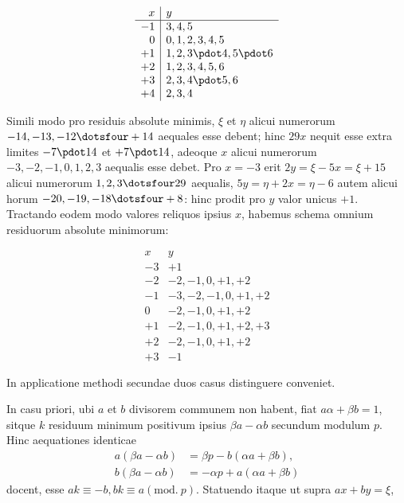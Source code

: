 %
\[
\begin{array}{r|l}
x&y\\\hline
-1&3,4,5\\
0&0,1,2,3,4,5\\
+1&1,2,3\pdot4,5\pdot6\\
+2&1,2,3,4,5,6\\
+3&2,3,4\pdot5,6\\
+4&2,3,4
\end{array}
\]

Simili modo pro residuis absolute minimis, $\xi$ et $\eta$ alicui numerorum $-14,-13,-12\dotsfour+14$ aequales esse debent; hinc $29x$ nequit esse extra limites $-7\pdot14$ et $+7\pdot14$, adeoque $x$ alicui numerorum $-3,-2,-1,0,1,2,3$ aequalis esse debet. Pro $x=-3$ erit $2y=\xi-5x=\xi+15$ alicui numerorum $1,2,3\dotsfour29$ aequalis, $5y=\eta+2x=\eta-6$ autem alicui horum $-20,-19,-18\dotsfour+8$: hinc prodit pro $y$ valor unicus $+1$. Tractando eodem modo valores reliquos ipsius $x$, habemus schema omnium residuorum absolute minimorum:

\[
\begin{array}{r|l}
x&y\\\hline
-3&+1\\
-2&-2,-1,0,+1,+2\\
-1&-3,-2,-1,0,+1,+2\\
0&-2,-1,0,+1,+2\\
+1&-2,-1,0,+1,+2,+3\\
+2&-2,-1,0,+1,+2\\
+3&-1
\end{array}
\]

In applicatione methodi secundae duos casus distinguere conveniet.

In casu priori, ubi $a$ et $b$ divisorem communem non habent, fiat $a\alpha+\beta b=1$, sitque $k$ residuum minimum positivum ipsius $\beta a-\alpha b$ secundum modulum $p$. Hinc aequationes identicae
\[
\begin{aligned}
a(\beta a-\alpha b)&=\beta p-b(\alpha a+\beta b),\\
b(\beta a-\alpha b)&=-\alpha p+a(\alpha a+\beta b)
\end{aligned}
\]
docent, esse $ak\equiv-b,bk\equiv a(\mathrm{mod.}\ p)$. Statuendo itaque ut supra $ax+by=\xi$,
